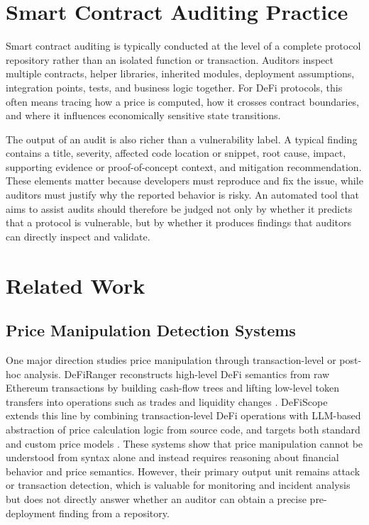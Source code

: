 \section{Smart Contract Auditing Practice}

Smart contract auditing is typically conducted at the level of a complete
protocol repository rather than an isolated function or transaction. Auditors
inspect multiple contracts, helper libraries, inherited modules, deployment
assumptions, integration points, tests, and business logic together. For DeFi
protocols, this often means tracing how a price is computed, how it crosses
contract boundaries, and where it influences economically sensitive state
transitions.

The output of an audit is also richer than a vulnerability label. A typical
finding contains a title, severity, affected code location or snippet, root
cause, impact, supporting evidence or proof-of-concept context, and mitigation
recommendation. These elements matter because developers must reproduce and fix
the issue, while auditors must justify why the reported behavior is risky. An
automated tool that aims to assist audits should therefore be judged not only
by whether it predicts that a protocol is vulnerable, but by whether it
produces findings that auditors can directly inspect and validate.

\section{Related Work}

\subsection{Price Manipulation Detection Systems}

One major direction studies price manipulation through transaction-level or
post-hoc analysis. DeFiRanger reconstructs high-level DeFi semantics from raw
Ethereum transactions by building cash-flow trees and lifting low-level token
transfers into operations such as trades and liquidity changes
\citep{defiranger}. DeFiScope extends this line by combining transaction-level
DeFi operations with LLM-based abstraction of price calculation logic from
source code, and targets both standard and custom price models
\citep{defiscope}. These systems show that price manipulation cannot be
understood from syntax alone and instead requires reasoning about financial
behavior and price semantics. However, their primary output unit remains attack
or transaction detection, which is valuable for monitoring and incident
analysis but does not directly answer whether an auditor can obtain a precise
pre-deployment finding from a repository.

